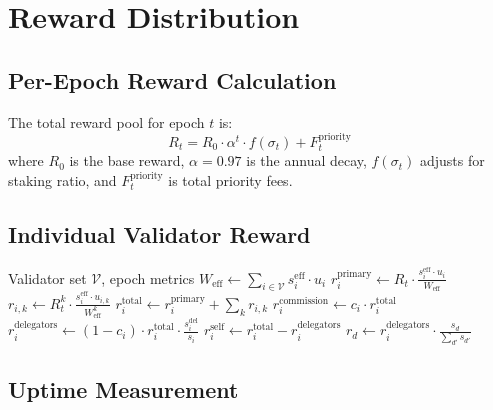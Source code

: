\section{Reward Distribution}
\label{sec:rewards}

\subsection{Per-Epoch Reward Calculation}

The total reward pool for epoch $t$ is:
\begin{equation}
    R_t = R_0 \cdot \alpha^t \cdot f(\sigma_t) + F_t^{\text{priority}}
\end{equation}
where $R_0$ is the base reward, $\alpha = 0.97$ is the annual decay, $f(\sigma_t)$ adjusts for staking ratio, and $F_t^{\text{priority}}$ is total priority fees.

\subsection{Individual Validator Reward}

\begin{algorithm}[H]
\caption{Epoch Reward Distribution}
\label{alg:rewards}
\begin{algorithmic}[1]
\Require Validator set $\mathcal{V}$, epoch metrics
\State $W_{\text{eff}} \gets \sum_{i \in \mathcal{V}} s_i^{\text{eff}} \cdot u_i$
    \State {}
    \State $r_i^{\text{primary}} \gets R_t \cdot \frac{s_i^{\text{eff}} \cdot u_i}{W_{\text{eff}}}$
    \State {}
        \State $r_{i,k} \gets R_t^k \cdot \frac{s_i^{\text{eff}} \cdot u_{i,k}}{W_{\text{eff}}^k}$
    \EndFor
    \State $r_i^{\text{total}} \gets r_i^{\text{primary}} + \sum_{k} r_{i,k}$
    \State {}
    \State $r_i^{\text{commission}} \gets c_i \cdot r_i^{\text{total}}$
    \State $r_i^{\text{delegators}} \gets (1 - c_i) \cdot r_i^{\text{total}} \cdot \frac{s_i^{\text{del}}}{s_i}$
    \State $r_i^{\text{self}} \gets r_i^{\text{total}} - r_i^{\text{delegators}}$
    \State {}
        \State $r_d \gets r_i^{\text{delegators}} \cdot \frac{s_d}{\sum_{d'} s_{d'}}$
    \EndFor
\EndFor
\end{algorithmic}
\end{algorithm}

\subsection{Uptime Measurement}

